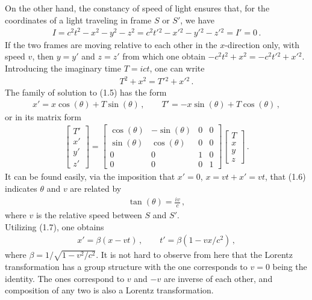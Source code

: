 \documentclass[11pt, onesided]{book}
\theoremstyle{break}
\theoremstyle{break}
\newcommand{\bmat}[1]{\begin{bmatrix} #1 \end{bmatrix}}
\begin{document}
On the other hand, the constancy of speed of light ensures that, for the coordinates of a light traveling in frame $S$ or $S'$, we have
\begin{align*}
I = c^2t^2 - x^2 - y^2 - z^2 = c^2t'{}^2 - x'{}^2 - y'{}^2 - z'{}^2 =  I' = 0\,.
\end{align*}
If the two frames are moving relative to each other in the $x$-direction only, with speed $v$, then $y=y'$ and $z=z'$ from which one obtain $-c^2 t^2 + x^2 = -c^2 t'{}^2 + x'{}^2$. Introducing the imaginary time $T = ict$, one can write
\begin{align}
T^2 +x^2 = T'{}^2 + x'{}^2\,.
\end{align}
The family of solution to (1.5) has the form
\begin{align}
x' = x \cos(\theta) + T\sin(\theta)\,,\qquad T'= -x\sin(\theta) + T\cos(\theta)\,,
\end{align}
or in its matrix form
\begin{align}
\bmat{T' \\ x' \\ y' \\ z'} = \bmat{\cos(\theta) & -\sin(\theta) & 0  & 0 \\
\sin(\theta) & \cos(\theta) & 0& 0\\
0 & 0 & 1 & 0\\
0 & 0 & 0 & 1}
\bmat{T \\ x \\ y \\z}\,.
\end{align}
It can be found easily, via the imposition that $x' = 0$, $x = vt+x' = vt$, that (1.6) indicates $\theta$ and $v$ are related by
\begin{align*}
\tan(\theta)  = \frac{iv}{c}\,,
\end{align*}
where $v$ is the relative speed between $S$ and $S'$.\\

Utilizing (1.7), one obtains
\begin{align}
 x' = \beta (x - vt) \,,\qquad t' = \beta (1- vx/c^2)\,,
\end{align}
where $\beta = 1/\sqrt{1 - v^2 / c^2}$. It is not hard to observe from here that the Lorentz transformation has a group structure with the one corresponds to $v = 0$ being the identity. The ones correspond to $v$ and $-v$ are inverse of each other, and composition of any two is also a Lorentz transformation. \\
\end{document}
